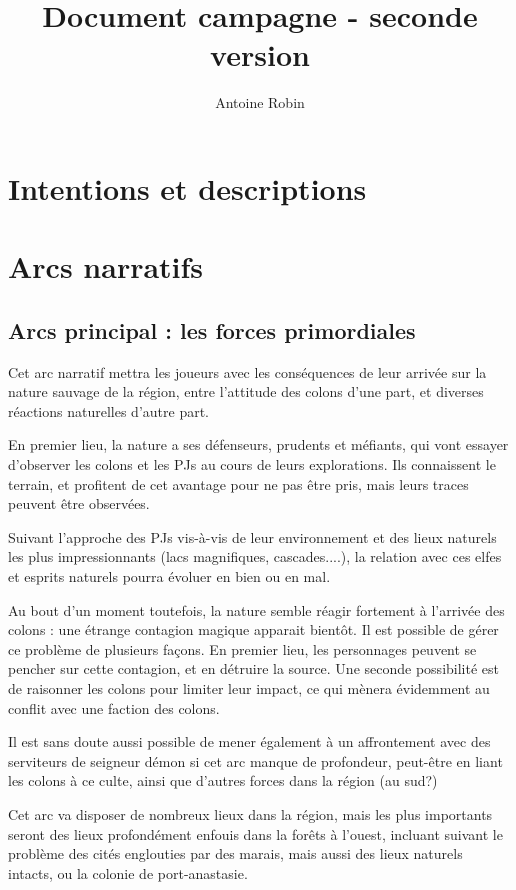 \documentclass[10pt,a4paper]{book}
\author{ Antoine Robin}
\title{Document campagne - seconde version}
\begin{document}
\chapter{Intentions et descriptions}

\chapter{Arcs narratifs}
\section{Arcs principal : les forces primordiales}
Cet arc narratif mettra les joueurs avec les conséquences de leur arrivée sur la nature sauvage de la région, entre l'attitude des colons d'une part, et diverses réactions naturelles d'autre part.

En premier lieu, la nature a ses défenseurs, prudents et méfiants, qui vont essayer d'observer les colons et les PJs au cours de leurs explorations. Ils connaissent le terrain, et profitent de cet avantage pour ne pas être pris, mais leurs traces peuvent être observées.

Suivant l'approche des PJs vis-à-vis de leur environnement et des lieux naturels les plus impressionnants (lacs magnifiques, cascades....), la relation avec ces elfes et esprits naturels pourra évoluer en bien ou en mal.

Au bout d'un moment toutefois, la nature semble réagir fortement à l'arrivée des colons : une étrange contagion magique apparait bientôt. Il est possible de gérer ce problème de plusieurs façons. En premier lieu, les personnages peuvent se pencher sur cette contagion, et en détruire la source. Une seconde possibilité est de raisonner les colons pour limiter leur impact, ce qui mènera évidemment au conflit avec une faction des colons.

Il est sans doute aussi possible de mener également à un affrontement avec des serviteurs de seigneur démon si cet arc manque de profondeur, peut-être en liant les colons à ce culte, ainsi que d'autres forces dans la région (au sud?)

Cet arc va disposer de nombreux lieux dans la région, mais les plus importants seront des lieux profondément enfouis dans la forêts à l'ouest, incluant suivant le problème des cités englouties par des marais, mais aussi des lieux naturels intacts, ou la colonie de port-anastasie.
\end{document}
